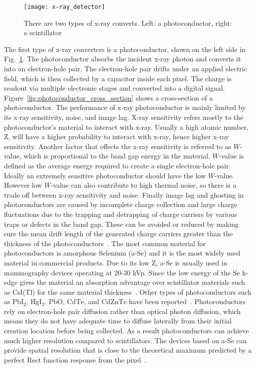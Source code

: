 \begin{figure}[ht]
\centering
\texttt{[image: x-ray\_detector]}
\caption{There are two types of x-ray converts.  Left: a photoconductor, right: a scintillator}
\label{fig:x-ray_detector}
\end{figure}

The first type of x-ray converters is a photoconductor, shown on the left side in Fig.~\ref{fig:x-ray_detector}.  The photoconductor absorbs the incident x-ray photon and converts it into an electron-hole pair.  The electron-hole pair drifts under an applied electric field, which is then collected by a capacitor inside each pixel.  The charge is readout via multiple electronic stages and converted into a digital signal.  Figure~\ref{fig:photoconductor_cross_section} shows a cross-section of a photoconductor.  The performance of x-ray photoconductor is mainly limited by its x-ray sensitivity, noise, and image lag.  X-ray sensitivity refers mostly to the photoconductor's material to interact with x-ray.  Usually a high atomic number, Z, will have a higher probability to interact with x-ray, hence higher x-ray sensitivity.  Another factor that effects the x-ray sensitivity is referred to as $W$-value, which is proportional to the band gap energy in the material.  $W$-value is defined as the average energy required to create a single electron-hole pair.  Ideally an extremely sensitive photoconductor should have the low $W$-value.  However low $W$-value can also contribute to high thermal noise, so there is a trade off between x-ray sensitivity and noise.  Finally image lag and ghosting in photoconductors are caused by incomplete charge collection and large charge fluctuations due to the trapping and detrapping of charge carriers by various traps or defects in the band gap.  These can be avoided or reduced by making sure the mean drift length of the generated charge carriers greater than the thickness of the photoconductors~\citep{Kim2008, kasap2006}.  The most common material for photoconductors is amorphous Selenium (a-Se) and it is the most widely used material in commercial products.  Due to its low Z, a-Se is usually used in mammography devices operating at 20-30 kVp.  Since the low energy of the Se k-edge gives the material an absorption advantage over scintillator materials such as CsI(Tl) for the same material thickness~\citep{Yorkston2007}.  Other types of photoconductors such as $\mathrm{PbI_2}$, $\mathrm{HgI_2}$, $\mathrm{PbO}$, $\mathrm{CdTe}$, and $\mathrm{CdZnTe}$ have been reported~\citep{springer2007}.  Photoconductors rely on electron-hole pair diffusion rather than optical photon diffusion, which means they do not have adequate time to diffuse laterally from their initial creation location before being collected.  As a result photoconductors can achieve much higher resolution compared to scintillators.  The devices based on a-Se can provide spatial resolution that is close to the theoretical maximum predicted by a perfect Rect function response from the pixel~\citep{hunt5030}. 

